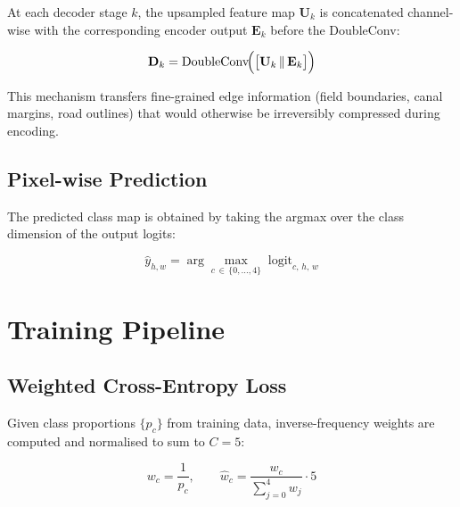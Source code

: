 \documentclass[12pt, a4paper]{article}
\begin{document}
At each decoder stage $k$, the upsampled feature map $\mathbf{U}_k$ is concatenated channel-wise with the corresponding encoder output $\mathbf{E}_k$ before the DoubleConv:

\begin{equation}
  \mathbf{D}_k = \operatorname{DoubleConv}\!\Bigl(\bigl[\mathbf{U}_k \,\|\, \mathbf{E}_k\bigr]\Bigr)
\end{equation}

This mechanism transfers fine-grained edge information (field boundaries, canal margins, road outlines) that would otherwise be irreversibly compressed during encoding.

\subsection{Pixel-wise Prediction}

The predicted class map is obtained by taking the argmax over the class dimension of the output logits:

\begin{equation}
  \hat{y}_{h,w} = \arg\max_{c \,\in\, \{0,\ldots,4\}} \; \text{logit}_{c,\,h,\,w}
\end{equation}

\section{Training Pipeline}
\label{sec:training}

\subsection{Weighted Cross-Entropy Loss}

Given class proportions $\{p_c\}$ from training data, inverse-frequency weights are computed and normalised to sum to $C = 5$:

\begin{equation}
  w_c = \frac{1}{p_c}, \qquad
  \hat{w}_c = \frac{w_c}{\displaystyle\sum_{j=0}^{4} w_j} \cdot 5
  \label{eq:weights}
\end{equation}
\end{document}
